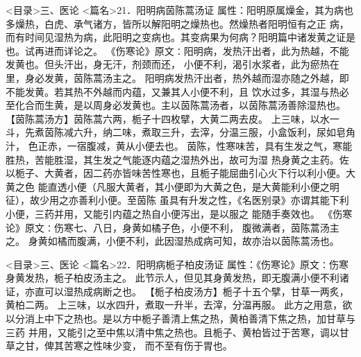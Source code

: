\documentclass[a4paper,12pt,UTF8,twoside]{ctexbook}
\begin{document}
<目录>三、医论
<篇名>21．阳明病茵陈蒿汤证
属性：阳明原属燥金，其为病也多燥热，白虎、承气诸方，皆所以解阳明之燥热也。然燥热者阳明恒有之正 
病，而有时间见湿热为病，此阳明之变病也。其变病果为何病？阳明篇中诸发黄之证是也。试再进而详论之。 
《伤寒论》原文∶阳明病，发热汗出者，此为热越，不能发黄也。但头汗出，身无汗，剂颈而还， 
小便不利，渴引水浆者，此为瘀热在里，身必发黄，茵陈蒿汤主之。 
阳明病发热汗出者，热外越而湿亦随之外越，即不能发黄。若其热不外越而内蕴，又兼其人小便不利，且 
饮水过多，其湿与热必至化合而生黄，是以周身必发黄也。主以茵陈蒿汤者，以茵陈蒿汤善除湿热也。 
【茵陈蒿汤方】茵陈蒿六两，栀子十四枚擘，大黄二两去皮。 
上三味，以水一斗，先煮茵陈减六升，纳二味，煮取三升，去滓，分温三服，小盒饭利，尿如皂角汁， 
色正赤，一宿腹减，黄从小便去也。 
茵陈，性寒味苦，具有生发之气，寒能胜热，苦能胜湿，其生发之气能逐内蕴之湿热外出，故可为湿 
热身黄之主药。佐以栀子、大黄者，因二药亦皆味苦性寒也，且栀子能屈曲引心火下行以利小便。大黄之色 
能直透小便（凡服大黄者，其小便即为大黄之色，是大黄能利小便之明征），故少用之亦善利小便。至茵陈 
虽具有升发之性，《名医别录》亦谓其能下利小便，三药并用，又能引内蕴之热自小便泻出，是以服之 
能随手奏效也。 
《伤寒论》原文∶伤寒七、八日，身黄如橘子色，小便不利， 
腹微满者，茵陈蒿汤主之。 
身黄如橘而腹满，小便不利，此因湿热成病可知，故亦治以茵陈蒿汤也。 

<目录>三、医论
<篇名>22．阳明病栀子柏皮汤证
属性：《伤寒论》原文∶伤寒身黄发热，栀子柏皮汤主之。 
此节示人，但见其身黄发热，即无腹满小便不利诸证，亦直可以湿热成病断之也。 
【栀子柏皮汤方】栀子十五个擘，甘草一两炙，黄柏二两。 
上三味，以水四升，煮取一升半，去滓，分温再服。 
此方之用意，欲以分消上中下之热也。是以方中栀子善清上焦之热，黄柏善清下焦之热，加甘草与三药 
并用，又能引之至中焦以清中焦之热也。且栀子、黄柏皆过于苦寒，调以甘草之甘，俾其苦寒之性味少变， 
而不至有伤于胃也。 
\end{document}
